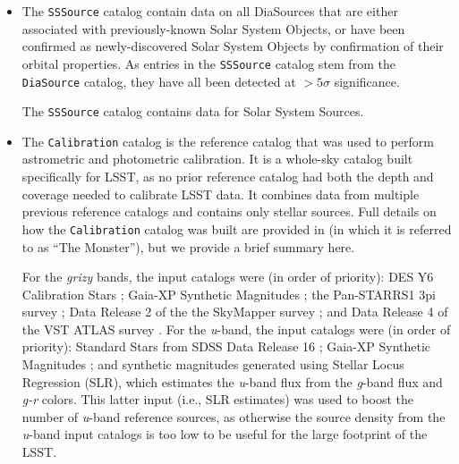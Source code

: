 \begin{itemize}
\item The \texttt{SSSource} catalog contain data on all DiaSources that are either associated with previously-known Solar System Objects, or have been confirmed as newly-discovered Solar System Objects by confirmation of their orbital properties. As entries in the \texttt{SSSource} catalog stem from the \texttt{DiaSource} catalog, they have all been detected at $>5\sigma$ significance.

The \texttt{SSSource} catalog contains data for \nsolarsystemsources Solar System Sources.



\item The \texttt{Calibration} catalog is the reference catalog that was used to perform astrometric and photometric \gls{calibration}. It is a whole-sky catalog built specifically for LSST, as no prior reference catalog had both the depth and coverage needed to calibrate LSST data.
It combines data from multiple previous reference catalogs and contains only stellar sources.
Full details on how the \texttt{Calibration} catalog was built are provided in \cite{DMTN-277} (in which it is referred to as ``The Monster''), but we provide a brief summary here.

For the \textit{grizy} bands, the input catalogs were (in order of priority): DES Y6 Calibration Stars \citep{2023arXiv230501695R}; Gaia-XP Synthetic Magnitudes \citep{2023A&A...674A..33G}; the Pan-STARRS1 3pi survey \citep{2016arXiv161205560C}; Data Release 2 of the the SkyMapper survey \citep{2019PASA...36...33O}; and Data Release 4 of the VST ATLAS survey \citep{2015MNRAS.451.4238S}. For the \textit{u}-band, the input catalogs were (in order of priority): Standard Stars from SDSS Data Release 16 \citep{2020ApJS..249....3A}; Gaia-XP Synthetic Magnitudes \citep{2023A&A...674A..33G}; and synthetic magnitudes generated using Stellar Locus Regression (SLR), which estimates the \textit{u}-band \gls{flux} from the \textit{g}-band \gls{flux} and \textit{g-r} colors. This latter input (i.e., SLR estimates) was used to boost the number of \textit{u}-band reference sources, as otherwise the source density from the \textit{u}-band input catalogs is too low to be useful for the large footprint of the LSST.


\end{itemize}
